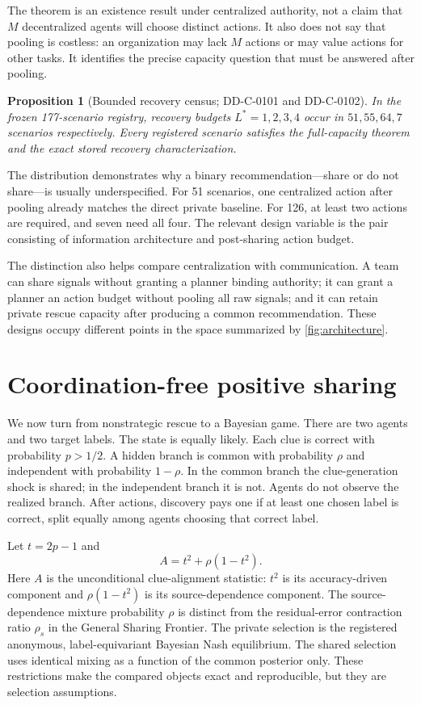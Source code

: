 \documentclass[12pt]{article}
\newtheorem{proposition}[theorem]{Proposition}
\theoremstyle{definition}
\begin{document}
The theorem is an existence result under centralized authority, not a claim
that $M$ decentralized agents will choose distinct actions. It also does not say
that pooling is costless: an organization may lack $M$ actions or may value
actions for other tasks. It identifies the precise capacity question that must
be answered after pooling.

\begin{proposition}[Bounded recovery census; DD-C-0101 and DD-C-0102]
In the frozen 177-scenario registry, recovery budgets $L^*=1,2,3,4$ occur in
$51,55,64,7$ scenarios respectively. Every registered scenario satisfies the
full-capacity theorem and the exact stored recovery characterization.
\end{proposition}

The distribution demonstrates why a binary recommendation---share or do not
share---is usually underspecified. For 51 scenarios, one centralized action
after pooling already matches the direct private baseline. For 126, at least two
actions are required, and seven need all four. The relevant design variable is
the pair consisting of information architecture and post-sharing action budget.

The distinction also helps compare centralization with communication. A team
can share signals without granting a planner binding authority; it can grant a
planner an action budget without pooling all raw signals; and it can retain
private rescue capacity after producing a common recommendation. These designs
occupy different points in the space summarized by \cref{fig:architecture}.

\section{Coordination-free positive sharing}

We now turn from nonstrategic rescue to a Bayesian game. There are two agents
and two target labels. The state is equally likely. Each clue is correct with
probability $p>1/2$. A hidden branch is common with probability $\rho$ and
independent with probability $1-\rho$. In the common branch the clue-generation
shock is shared; in the independent branch it is not. Agents do not observe the
realized branch. After actions, discovery pays one if at least one chosen label
is correct, split equally among agents choosing that correct label.

Let $t=2p-1$ and
\[
 A=t^2+\rho(1-t^2).
\]
Here $A$ is the unconditional clue-alignment statistic: $t^2$ is its
accuracy-driven component and $\rho(1-t^2)$ is its source-dependence component.
The source-dependence mixture probability $\rho$ is distinct from the
residual-error contraction ratio $\rho_s$ in the General Sharing Frontier.
The private selection is the registered anonymous, label-equivariant Bayesian
Nash equilibrium. The shared selection uses identical mixing as a function of
the common posterior only. These restrictions make the compared objects exact
and reproducible, but they are selection assumptions.
\end{document}
